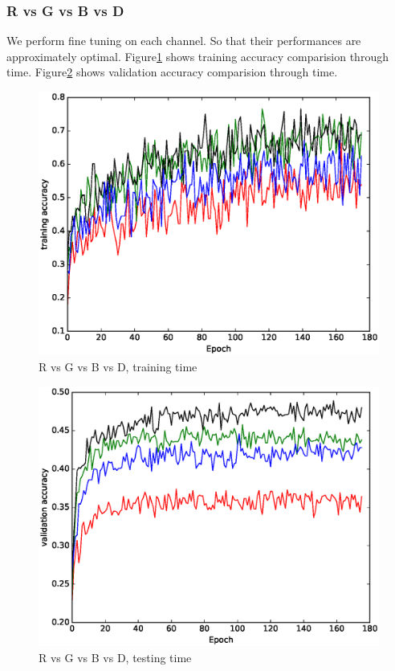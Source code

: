 \documentclass[10pt,twocolumn,letterpaper]{article}
\begin{document}
\subsubsection{R vs G vs B vs D}
We perform fine tuning on each channel. So that their performances are approximately optimal.
Figure\ref{fig:channeltrain} shows training accuracy comparision through time. 
Figure\ref{fig:channeltest} shows validation accuracy comparision through time. 
\begin{figure}
\includegraphics[width=\linewidth]{../presentation/train.eps}
\caption{R vs G vs B vs D, training time}
\label{fig:channeltrain}
\end{figure}
\begin{figure}
\includegraphics[width=\linewidth]{../presentation/test.eps}
\caption{R vs G vs B vs D, testing time}
\label{fig:channeltest}
\end{figure}
\end{document}
